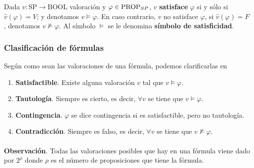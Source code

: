 \begin{definition} Dada $v: \mbox{SP} \rightarrow \mbox{BOOL}$ valoración y $\varphi \in \mbox{PROP}_{SP}$, $v$ \textbf{satisface} $\varphi$ si y sólo si $\widehat{v}(\varphi)=V$; y denotamos $v \models \varphi$. En caso contrario, $v$ no satisface $\varphi$, si $\widehat{v}(\varphi)=F$, denotamos $v \not\models \varphi$. Al símbolo $\models$ se le denomina \textbf{símbolo de satisficidad}.
\end{definition}

\subsubsection*{Clasificación de fórmulas}
\begin{definition} Según como sean las valoraciones de una fórmula, podemos clarificarlas en
\begin{enumerate}
	\item \textbf{Satisfactible}. Existe alguna valoración $v$ tal que $v \models \varphi$.
	\item \textbf{Tautología}. Siempre es cierto, es decir, $\forall v$ se tiene que $v \models \varphi$.
	\item \textbf{Contingencia}. $\varphi$ se dice contingencia si es satisfactible, pero no tautología. 
	\item \textbf{Contradicción}. Siempre es falso, es decir, $\forall v$ se tiene que $v \not \models \varphi$.
\end{enumerate}
\end{definition}
\paragraph{}
\addtocounter{obs}{1} %
\textbf{Observación}. Todas las valoraciones posibles que hay en una fórmula viene dado por $2^{\rho}$ donde $\rho$ es el número de proposiciones que tiene la fórmula.